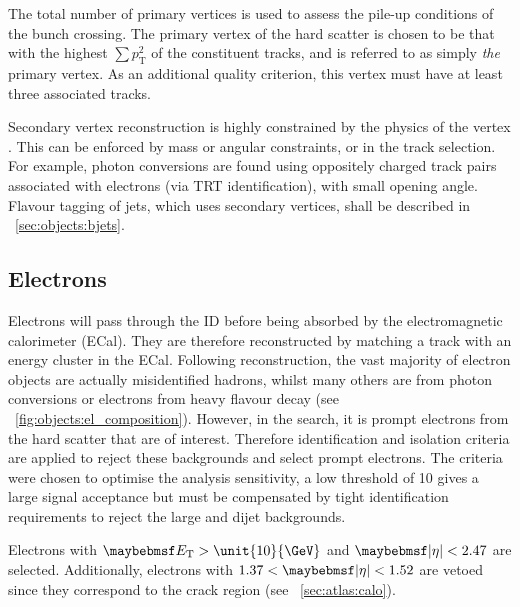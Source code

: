 The total number of primary vertices \npv is used to assess the pile-up conditions of 
the bunch crossing. The primary vertex of the hard scatter is chosen to be that with the 
highest $\sum p_{\text{T}}^2$ of the constituent tracks, and is referred to as simply 
\textit{the} primary vertex. As an additional quality criterion, this vertex must have at 
least three associated tracks.

Secondary vertex reconstruction is highly constrained by the physics of the vertex 
\cite{AllVertexFinding}. This can be enforced by mass or angular constraints, or in the 
track selection. For example, photon conversions are found using oppositely charged 
track pairs associated with electrons (via TRT identification), with small 
opening angle. Flavour tagging of jets, which uses secondary vertices, shall be described in 
\Section~\ref{sec:objects:bjets}.



\subsection{Electrons}
\label{sec:objects:electrons}

Electrons will pass through the ID before being absorbed by the electromagnetic calorimeter 
(ECal). They are therefore reconstructed by matching a track with an energy cluster in the 
ECal. Following reconstruction, the vast majority of electron objects are actually 
misidentified hadrons, 
whilst many others are from photon conversions or electrons from heavy flavour decay (see 
\Figure~\ref{fig:objects:el_composition}). However, in the \HWWlvlv search, it is prompt 
electrons from the hard scatter that are of interest. Therefore identification and 
isolation criteria are applied to reject these backgrounds and select prompt electrons. 
The criteria were chosen to optimise the analysis sensitivity, \eg a low \et threshold 
of \unit{10}{\GeV} gives a large signal acceptance but must be compensated by tight 
identification requirements to reject the large \Wjets and dijet backgrounds.

Electrons with $\et > \unit{10}{\GeV}$ and $\mods{\eta} < 2.47$ are selected. Additionally, 
electrons with $1.37 < \mods{\eta} < 1.52$ are vetoed since they correspond
to the crack region (see \Section~\ref{sec:atlas:calo}).

